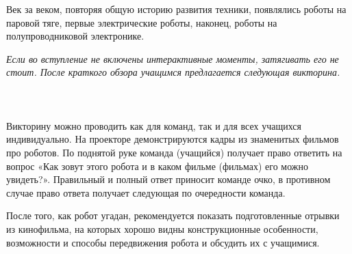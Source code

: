 Век за веком, повторяя общую историю развития техники, появлялись роботы на паровой тяге,  первые электрические роботы, наконец, роботы на полупроводниковой электронике.

{\slshape Если во вступление не включены интерактивные моменты, затягивать его не стоит. После краткого обзора учащимся предлагается следующая викторина.}\\\\

{\hypertarget{lesson1x3}{}}\\\\

Викторину можно проводить как для команд, так и для всех учащихся индивидуально. На проекторе демонстрируются кадры из знаменитых фильмов про роботов. По поднятой руке команда (учащийся) получает право ответить на вопрос «Как зовут этого робота и в каком фильме (фильмах) его можно увидеть?». Правильный и полный ответ приносит команде очко, в противном случае право ответа получает следующая по очередности команда.

После того, как робот угадан, рекомендуется показать подготовленные отрывки из кинофильма, на которых хорошо видны конструкционные особенности, возможности и способы передвижения робота и обсудить их с учащимися. 

